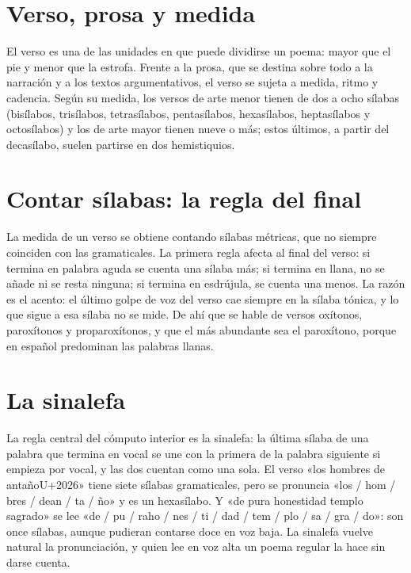\documentclass{book}
\begin{document}
\section{Verso, prosa y medida}

El verso es una de las unidades en que puede dividirse un poema: mayor que el pie y menor que la estrofa. Frente a la prosa, que se destina sobre todo a la narración y a los textos argumentativos, el verso se sujeta a medida, ritmo y cadencia. Según su medida, los versos de arte menor tienen de dos a ocho sílabas (bisílabos, trisílabos, tetrasílabos, pentasílabos, hexasílabos, heptasílabos y octosílabos) y los de arte mayor tienen nueve o más; estos últimos, a partir del decasílabo, suelen partirse en dos hemistiquios.


\section{Contar sílabas: la regla del final}

La medida de un verso se obtiene contando sílabas métricas, que no siempre coinciden con las gramaticales. La primera regla afecta al final del verso: si termina en palabra aguda se cuenta una sílaba más; si termina en llana, no se añade ni se resta ninguna; si termina en esdrújula, se cuenta una menos. La razón es el acento: el último golpe de voz del verso cae siempre en la sílaba tónica, y lo que sigue a esa sílaba no se mide. De ahí que se hable de versos oxítonos, paroxítonos y proparoxítonos, y que el más abundante sea el paroxítono, porque en español predominan las palabras llanas.


\section{La sinalefa}

La regla central del cómputo interior es la sinalefa: la última sílaba de una palabra que termina en vocal se une con la primera de la palabra siguiente si empieza por vocal, y las dos cuentan como una sola. El verso «los hombres de antaño{U+2026}» tiene siete sílabas gramaticales, pero se pronuncia «los / hom / bres / dean / ta / ño» y es un hexasílabo. Y «de pura honestidad templo sagrado» se lee «de / pu / raho / nes / ti / dad / tem / plo / sa / gra / do»: son once sílabas, aunque pudieran contarse doce en voz baja. La sinalefa vuelve natural la pronunciación, y quien lee en voz alta un poema regular la hace sin darse cuenta.
\end{document}
